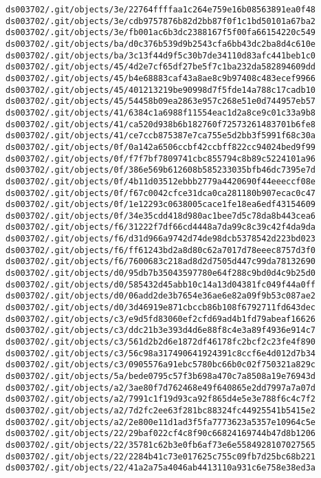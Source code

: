 \documentclass[11pt]{article}
\begin{document}
\begin{Verbatim}[commandchars=\\\{\}]
ds003702/.git/objects/3e/22764ffffaa1c264e759e16b08563891ea0f48
ds003702/.git/objects/3e/cdb9757876b82d2bb87f0f1c1bd50101a67ba2
ds003702/.git/objects/3e/fb001ac6b3dc2388167f5f00fa66154220c549
ds003702/.git/objects/ba/d0c376b539d9b2543cfa6bb43dc2ba8d4c610e
ds003702/.git/objects/ba/3c13f44d9f5c30b7de34110d83afc441beb1c0
ds003702/.git/objects/45/4d2e7cf65df27be5f7c1ba232da582894609dd
ds003702/.git/objects/45/b4e68883caf43a8ae8c9b97408c483ecef9966
ds003702/.git/objects/45/401213219be90998d7f5fde14a788c17cadb10
ds003702/.git/objects/45/54458b09ea2863e957c268e51e0d744957eb57
ds003702/.git/objects/41/6384c1a6988f11554eac1d2a8ce9c01c33a9b8
ds003702/.git/objects/41/ca520d938b6b182760f72573261483701b6fe8
ds003702/.git/objects/41/ce7ccb875387e7ca755e5d2bb3f5991f68c30a
ds003702/.git/objects/0f/0a142a6506ccbf42ccbff822cc94024bed9f99
ds003702/.git/objects/0f/f7f7bf7809741cbc855794c8b89c5224101a96
ds003702/.git/objects/0f/386e569b612608b585233035bfb46dc7395e7d
ds003702/.git/objects/0f/4b11d03512ebbb2779a4420690f44eeeccf08e
ds003702/.git/objects/0f/f67c0042cfce31dca0ca281180b907ecac0c47
ds003702/.git/objects/0f/1e12293c0638005cace1fe18ea6edf43154609
ds003702/.git/objects/0f/34e35cdd418d980ac1bee7d5c78da8b443cea6
ds003702/.git/objects/f6/31222f7df66cd4448a7da99c8c39c42f4da9da
ds003702/.git/objects/f6/d31d966a9742d74de98dcb5378542d223bd023
ds003702/.git/objects/f6/ff61243bd2a8d80c62a7017d78eeec8757d3f0
ds003702/.git/objects/f6/7600683c218ad8d2d7505d447c99da78132690
ds003702/.git/objects/d0/95db7b35043597780e64f288c9bd0d4c9b25d0
ds003702/.git/objects/d0/585432d45abb10c14a13d04381fc049f44a0ff
ds003702/.git/objects/d0/06add2de3b7654e36ae6e82a09f9b53c087ae2
ds003702/.git/objects/d0/3d46919e871cbccb86b108f6792711fd643dec
ds003702/.git/objects/c3/e9d5fd83060ef2cfd69ad4b1fd79abeaf16626
ds003702/.git/objects/c3/ddc21b3e393d4d6e88f8c4e3a89f4936e914c7
ds003702/.git/objects/c3/561d2b2d6e1872df46178fc2bcf2c23fe4f890
ds003702/.git/objects/c3/56c98a317490641924391c8ccf6e4d012d7b34
ds003702/.git/objects/c3/0905576a91ebc5780bc66b0c02f750321a829c
ds003702/.git/objects/5a/bede0795c57f3b698a470c7a8508a19e76943d
ds003702/.git/objects/a2/3ae80f7d762468e49f640865e2dd7997a7a07d
ds003702/.git/objects/a2/7991c1f19d93ca92f865d4e5e3e788f6c4c7f2
ds003702/.git/objects/a2/7d2fc2ee63f281bc88324fc44925541b5415e2
ds003702/.git/objects/a2/2e800e11d1ad3f5fa7773623a5357e10964c5e
ds003702/.git/objects/22/29baf022cf4c8f90c66824169744b47d8b1206
ds003702/.git/objects/22/35781c62b3e0fb6af73e6e5584928107027565
ds003702/.git/objects/22/2284b41c73e017625c755c09fb7d25bc68b221
ds003702/.git/objects/22/41a2a75a4046ab4413110a931c6e758e38ed3a

\end{Verbatim}
\end{document}
